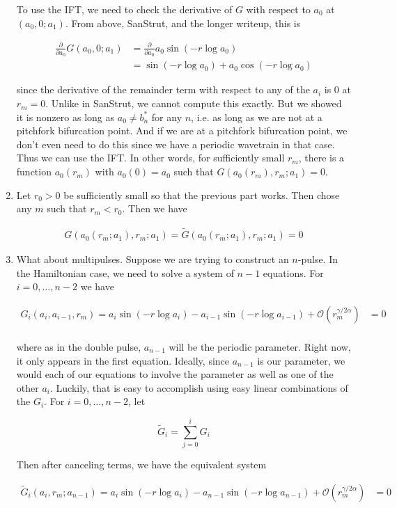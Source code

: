 \documentclass[12pt]{article}
\begin{document}
\begin{enumerate}
To use the IFT, we need to check the derivative of $G$ with respect to $a_0$ at $(a_0, 0; a_1)$. From above, SanStrut, and the longer writeup, this is

\begin{align*}
\frac{\partial}{\partial a_0} G(a_0, 0; a_1) &=
\frac{\partial}{\partial a_0} a_0 \sin \left( -r \log a_0 \right) \\
&= \sin \left( -r \log a_0 \right) + a_0 \cos \left( -r \log a_0 \right)
\end{align*}

since the derivative of the remainder term with respect to any of the $a_i$ is 0 at $r_m = 0$. Unlike in SanStrut, we cannot compute this exactly. But we showed it is nonzero as long as $a_0 \neq b^*_n$ for any $n$, i.e. as long as we are not at a pitchfork bifurcation point. And if we are at a pitchfork bifurcation point, we don't even need to do this since we have a periodic wavetrain in that case. Thus we can use the IFT. In other words, for sufficiently small $r_m$, there is a function $a_0(r_m)$ with $a_0(0) = a_0$ such that $G(a_0(r_m), r_m; a_1) = 0$.

\item Let $r_0 > 0$ be sufficiently small so that the previous part works. Then chose any $m$ such that $r_m < r_0$. Then we have

\begin{align*}
G(a_0(r_m; a_1), r_m; a_1) = \tilde{G}(a_0(r_m; a_1), r_m; a_1) = 0
\end{align*}

\item What about multipulses. Suppose we are trying to construct an $n$-pulse. In the Hamiltonian case, we need to solve a system of $n - 1$ equations. For $i = 0, \dots, n-2$ we have

\begin{align*}
G_i(a_i, a_{i-1}, r_m) = 
a_i \sin \left( -r \log a_i \right) - a_{i-1} \sin \left( -r \log a_{i-1} \right) + \mathcal{O}(r_m^{\gamma / 2 \alpha}) &= 0 \\
\end{align*}

where as in the double pulse, $a_{n-1}$ will be the periodic parameter. Right now, it only appears in the first equation. Ideally, since $a_{n-1}$ is our parameter, we would each of our equations to involve the parameter as well as one of the other $a_i$. Luckily, that is easy to accomplish using easy linear combinations of the $G_i$. For $i = 0, \dots, n-2$, let

\begin{equation}
\tilde{G}_i = \sum_{j = 0}^i G_i
\end{equation}

Then after canceling terms, we have the equivalent system

\begin{align}
\tilde{G}_i(a_i, r_m; a_{n-1}) = 
a_i \sin \left( -r \log a_i \right) - a_{n-1} \sin \left( -r \log a_{n-1} \right) + \mathcal{O}(r_m^{\gamma / 2 \alpha}) &= 0 \\
\end{align}

\end{enumerate}
\end{document}
